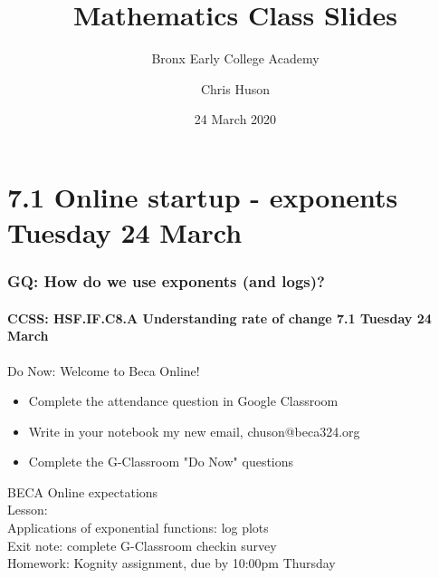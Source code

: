 \documentclass{beamer}
\title{Mathematics Class Slides}
\subtitle{Bronx Early College Academy}
\author{Chris Huson}
\date{24 March 2020}
\begin{document}
\frame{\titlepage}
\section[Outline]{}
\frame{\tableofcontents}

\section{7.1 Online startup - exponents \hfill Tuesday 24 March}
  \frame
  {
    \frametitle{GQ: How do we use exponents (and logs)?}
    \framesubtitle{CCSS: HSF.IF.C8.A Understanding rate of change \hfill \alert{7.1 Tuesday 24 March}}
    \begin{block}{Do Now: Welcome to Beca Online!}
      \begin{itemize}
        \item Complete the attendance question in Google Classroom
        \item Write in your notebook my new email, chuson@beca324.org
        \item Complete the G-Classroom "Do Now" questions
      \end{itemize}
  
      \end{block}
      BECA Online expectations \\[0.25cm]
      Lesson: \\
      Applications of exponential functions: log plots \\
      Exit note: complete G-Classroom checkin survey \\
      Homework: Kognity assignment, due by 10:00pm Thursday
      }
\end{document}

